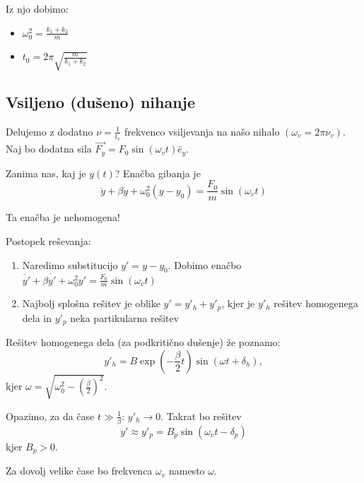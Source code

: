 Iz njo dobimo:
\begin{itemize}
    \item \(\omega_0^2 = \frac{k_1 + k_2}{m}\)
    \item \(t_0 = 2 \pi \sqrt{\frac{m}{k_1 + k_2}}\)
\end{itemize}

\subsection{Vsiljeno (dušeno) nihanje}
Delujemo z dodatno \(\nu = \frac{1}{t_v}\) frekvenco vsiljevanja na našo nihalo \((\omega_v = 2 \pi \nu_v)\). Naj bo dodatna sila \(\vec{F_y} = F_0 \sin(\omega_v t) \hat{e}_y\).

Zanima nas, kaj je \(y(t)\)? Enačba gibanja je 
\[
\boxed{\ddot{y} + \beta \dot{y} + \omega_0^2(y-y_0) = \frac{F_0}{m} \sin(\omega_vt)}
\]

\begin{opomba}
    Ta enačba je nehomogena!
\end{opomba}

Postopek reševanja:
\begin{enumerate}
    \item Naredimo substitucijo \(y' = y - y_0\). Dobimo enačbo \(\ddot{y'} + \beta \dot{y'} + \omega_0^2y' = \frac{F_0}{m} \sin(\omega_vt)\)
    \item Najbolj splošna rešitev je oblike \(y' = y'_h + y'_p\), kjer je \(y'_h\) rešitev homogenega dela in \(y'_p\) neka partikularna rešitev
\end{enumerate}

Rešitev homogenega dela (za podkritično dušenje) že poznamo: \[y'_h = B \exp\left(- \frac{\beta}{2}t\right) \sin(\omega t + \delta_h),\]
kjer \(\omega = \sqrt{\omega_0^2 - \left(\frac{\beta}{2}\right)^2}\).

Opazimo, za da čase \(t \gg \frac{1}{\beta}\): \(y'_h \to 0\). Takrat bo rešitev
\[
\boxed{y' \approx y'_p = B_p \sin(\omega_v t - \delta_p)}
\]
kjer \(B_p > 0\).

\begin{opomba}
    Za dovolj velike čase bo frekvenca \(\omega_v\) namesto \(\omega\).
\end{opomba}

\newpage
